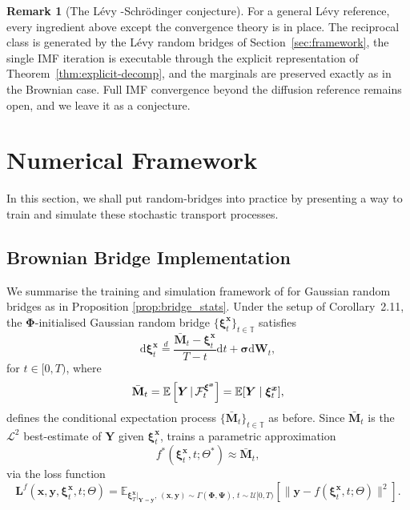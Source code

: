 \documentclass{article}
\newcommand{\levy}{{L\'evy }}
\newcommand{\Schrodinger}{Schr\"odinger\xspace}
\def\E{\mathbb{E}}
\def\T{\mathbb{T}}
\def\dd{\mathrm{d}}
\def\F{\mathcal{F}}
\def\xib{\boldsymbol{\xi}}
\theoremstyle{definition}
\newtheorem{remark}[proposition]{Remark}
\begin{document}
\begin{remark}[The \levy-\Schrodinger conjecture]
For a general \levy reference, every ingredient above except the convergence theory is in place. The reciprocal class is generated by the \levy random bridges of Section~\ref{sec:framework}, the single IMF iteration is executable through the explicit representation of Theorem~\ref{thm:explicit-decomp}, and the marginals are preserved exactly as in the Brownian case. Full IMF convergence beyond the diffusion reference remains open, and we leave it as a conjecture.
\end{remark}

\section{Numerical Framework}\label{sec:numerics}
In this section, we shall put random-bridges into practice by presenting a way to train and simulate these stochastic transport processes.

\subsection{Brownian Bridge Implementation}\label{sec:num-brownian}
We summarise the training and simulation framework of \cite{goria_random-bridges_2025} for Gaussian random bridges as in Proposition \ref{prop:bridge_stats}. Under the setup of Corollary~2.11, the $\boldsymbol{\Phi}$-initialised Gaussian random bridge $\{\xib_t^{\boldsymbol{x}}\}_{t\in\T}$ satisfies
\begin{equation}
    \dd\xib_t^{\boldsymbol{x}} \overset{d}{=} \frac{\bar{\mathbf{M}}_t - \xib_t^{\boldsymbol{x}}}{T - t}\dd t + \boldsymbol{\sigma}\dd\boldsymbol{W}_t, \label{eq:goria_bridge_sde}
\end{equation}
for $t \in [0, T)$, where
\begin{align}
\bar{\mathbf{M}}_t = \E\left[ \boldsymbol{Y} \, | \, \F_{t}^{\xib^{\boldsymbol{x}}} \right] = \E[\boldsymbol{Y} \mid \xib_t^{\boldsymbol{x}}], \notag
\end{align}
defines the conditional expectation process $\{\bar{\mathbf{M}}_t\}_{t\in\T}$ as before. Since $\bar{\mathbf{M}}_t$ is the $\mathcal{L}^2$ best-estimate of $\boldsymbol{Y}$ given $\xib_t^{\boldsymbol{x}}$, \cite{goria_random-bridges_2025} trains a parametric approximation
\begin{equation}
    f^*(\xib_t^{\boldsymbol{x}}, t; \Theta^*) \approx \bar{\mathbf{M}}_t, \label{eq:goria_network}
\end{equation}
via the loss function
\begin{equation}
    \boldsymbol{L}^f(\boldsymbol{x}, \boldsymbol{y}, \xib_t^{\boldsymbol{x}}, t; \Theta) = \E_{\xib_T^{\boldsymbol{x}} |_{\boldsymbol{Y}=\boldsymbol{y}},\, (\boldsymbol{x},\boldsymbol{y})\sim\Gamma(\boldsymbol{\Phi},\boldsymbol{\Psi}),\, t\sim\mathcal{U}[0,T)} \left[\|\boldsymbol{y} - f(\xib_t^{\boldsymbol{x}}, t; \Theta)\|^2\right]. \label{eq:goria_loss}
\end{equation}
\end{document}
